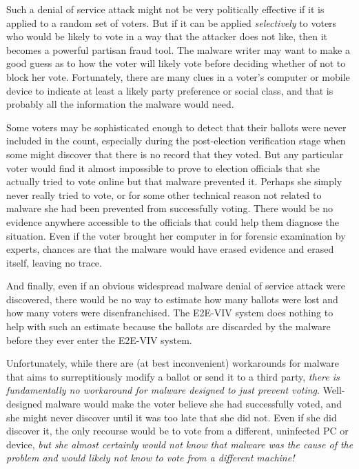 \begin{enumerate}[label={\roman*})]
  Such a denial of service attack might not be very politically
  effective if it is applied to a random set of voters.  But if it can
  be applied \emph{selectively} to voters who would be likely to vote
  in a way that the attacker does not like, then it becomes a powerful
  partisan fraud tool.  The malware writer may want to make a good
  guess as to how the voter will likely vote before deciding whether
  of not to block her vote.  Fortunately, there are many clues in a
  voter’s computer or mobile device to indicate at least a likely
  party preference or social class, and that is probably all the
  information the malware would need.

  Some voters may be sophisticated enough to detect that their ballots
  were never included in the count, especially during the
  post-election verification stage when some might discover that there
  is no record that they voted. But any particular voter would find it
  almost impossible to prove to election officials that she actually
  tried to vote online but that malware prevented it. Perhaps she
  simply never really tried to vote, or for some other technical
  reason not related to malware she had been prevented from
  successfully voting. There would be no evidence anywhere accessible
  to the officials that could help them diagnose the situation. Even
  if the voter brought her computer in for forensic examination by
  experts, chances are that the malware would have erased evidence and
  erased itself, leaving no trace.

  And finally, even if an obvious widespread malware denial of service
  attack were discovered, there would be no way to estimate how many
  ballots were lost and how many voters were disenfranchised. The
  E2E-VIV system does nothing to help with such an estimate because
  the ballots are discarded by the malware before they ever enter the
  E2E-VIV system.

  Unfortunately, while there are (at best inconvenient) workarounds
  for malware that aims to surreptitiously modify a ballot or send it
  to a third party, \emph{there is fundamentally no workaround for
    malware designed to just prevent voting}.  Well-designed malware
  would make the voter believe she had successfully voted, and she
  might never discover until it was too late that she did not. Even if
  she did discover it, the only recourse would be to vote from a
  different, uninfected PC or device, \emph{but she almost certainly
    would not know that malware was the cause of the problem and would
    likely not know to vote from a different machine!}

\end{enumerate}

